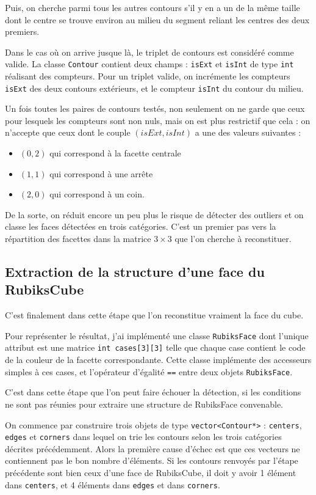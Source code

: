 \documentclass[a4paper,11pt]{article}
\begin{document}
Puis, on cherche parmi tous les autres contours s'il y en a un de la même taille dont le centre se trouve environ
au milieu du segment reliant les centres des deux premiers.

Dans le cas où on arrive jusque là, le triplet de contours est considéré comme valide. La classe \verb|Contour| 
contient deux champs : \verb|isExt| et \verb|isInt| de type \verb|int| réalisant des compteurs. Pour un triplet
valide, on incrémente les compteurs \verb|isExt| des deux contours extérieurs, et le compteur \verb|isInt| du 
contour du milieu.

Un fois toutes les paires de contours testés, non seulement on ne garde que ceux pour lesquels les compteurs sont
non nuls, mais on est plus restrictif que cela : on n'accepte que ceux dont le couple $(isExt,isInt)$ a une des
valeurs suivantes :
\begin{itemize}
 \item $(0, 2)$ qui correspond à la facette centrale
 \item $(1, 1)$ qui correspond à une arrête
 \item $(2, 0)$ qui correspond à un coin.
\end{itemize}
De la sorte, on réduit encore un peu plus le risque de détecter des outliers et on classe les faces détectées en
trois catégories. C'est un premier pas vers la répartition des facettes dans la matrice $3\times3$ que l'on 
cherche à reconstituer.

\subsection{Extraction de la structure d'une face du RubiksCube}
C'est finalement dans cette étape que l'on reconstitue vraiment la face du cube.

Pour représenter le résultat, j'ai implémenté une classe \verb|RubiksFace| dont l'unique attribut est une matrice
\verb|int cases[3][3]| telle que chaque case contient le code de la couleur de la facette correspondante. Cette
classe implémente des accesseurs simples à ces cases, et l'opérateur d'égalité \verb|==| entre deux objets
\verb|RubiksFace|.

C'est dans cette étape que l'on peut faire échouer la détection, si les conditions ne sont pas réunies pour 
extraire une structure de RubiksFace convenable.

On commence par construire trois objets de type \verb|vector<Contour*>| : \verb|centers|, \verb|edges| et 
\verb|corners| dans lequel on trie les contours selon les trois catégories décrites précédemment.
Alors la première cause d'échec est que ces vecteurs ne contiennent pas le bon nombre d'éléments. Si les 
contours renvoyés par l'étape précédente sont bien ceux d'une face de RubiksCube, il doit y avoir 1 élément
dans \verb|centers|, et 4 éléments dans \verb|edges| et dans \verb|corners|.
\end{document}
